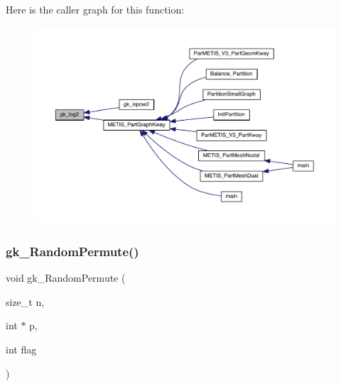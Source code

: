 Here is the caller graph for this function\+:\nopagebreak
\begin{figure}[H]
\begin{center}
\leavevmode
\includegraphics[width=350pt]{a00867_abd15453cc17729704313317fd612fc6b_icgraph}
\end{center}
\end{figure}
\mbox{\label{a00867_a3f23c758d814c21be0a0a840234c6429}} 
\subsubsection{\texorpdfstring{gk\+\_\+\+Random\+Permute()}{gk\_RandomPermute()}}
{\footnotesize\ttfamily void gk\+\_\+\+Random\+Permute (\begin{DoxyParamCaption}\item[{size\+\_\+t}]{n,  }\item[{int $\ast$}]{p,  }\item[{int}]{flag }\end{DoxyParamCaption})}

